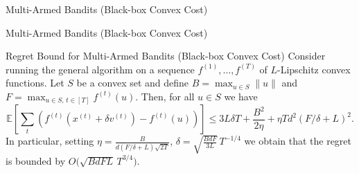 \begin{frame}{Multi-Armed Bandits (Black-box Convex Cost)}
\small
\begin{center}
\end{center}
\end{frame}

\begin{frame}{Multi-Armed Bandits (Black-box Convex Cost)}
\small
\begin{block}{Regret Bound for Multi-Armed Bandits (Black-box Convex Cost)}
    Consider running the general algorithm on a
    sequence $f^{(1)}, \ldots, f^{(T)}$ of $L$-Lipschitz convex functions. Let $S$ be a
    convex set and define $B = \max_{u \in S} \|u\|$ and
    $F = \max_{u \in S,\, t \in [T]} f^{(t)}(u)$. Then, for all $u \in S$ we have
    $$
    \mathbb{E}\left[\sum_t \left(f^{(t)}(x^{(t)} + \delta v^{(t)}) - f^{(t)}(u)\right)\right]
    \leq 3L\delta T + \frac{B^2}{2\eta} + \eta T d^2 (F/\delta + L)^2.
    $$
    In particular, setting $\eta = \frac{B}{d(F/\delta + L)\sqrt{2T}}$,
    $\delta = \sqrt{\frac{BdF}{3L}}\, T^{-1/4}$ we obtain that the regret is bounded
    by $O\big(\sqrt{BdFL}\, T^{3/4}\big)$.
\end{block}
\end{frame}


